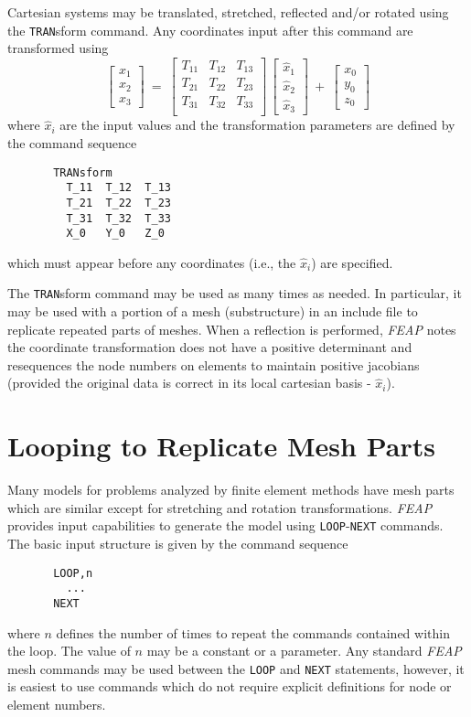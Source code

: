 Cartesian systems may be translated, stretched, reflected and/or rotated using
the {\tt TRAN}\-sform command.
Any coordinates input after this command are transformed using
$$\left[
\begin{matrix} x_1 \\ x_2 \\ x_3 \end{matrix} \right] ~=~
\left[
\begin{matrix}
T_{11} & T_{12} & T_{13} \\
T_{21} & T_{22} & T_{23} \\
T_{31} & T_{32} & T_{33} \\
\end{matrix} \right] \,
\left[
\begin{matrix} \hat x_1 \\ \hat x_2 \\ \hat x_3
\end{matrix} \right] ~+~
\left[
\begin{matrix} x_0 \\ y_0 \\ z_0
\end{matrix} \right]$$
where $\hat x_i$ are the input values and the transformation parameters are
defined by the command sequence
\begin{verbatim}
       TRANsform
         T_11  T_12  T_13
         T_21  T_22  T_23
         T_31  T_32  T_33
         X_0   Y_0   Z_0
\end{verbatim}
which must appear before any coordinates (i.e., the $\hat x_i$) are specified.

The {\tt TRAN}sform command may be used as many times as needed.  In particular,
it may be used with a portion of a mesh (substructure) in an include file
to replicate repeated parts of meshes.  When a reflection is performed,
{\sl FEAP} notes the coordinate transformation does not have a positive
determinant and resequences the node numbers on elements to maintain
positive jacobians (provided the original data is correct in its local
cartesian basis - $\hat{x}_i$).

\section{Looping to Replicate Mesh Parts}
\label{mloop}

Many models for problems analyzed by finite element methods have mesh parts
which are similar except for stretching and rotation transformations.
\textsl{FEAP} provides input capabilities to generate the model using
\texttt{LOOP}-\texttt{NEXT} commands.  The basic input structure is given
by the command sequence
\begin{verbatim}
       LOOP,n
         ...
       NEXT
\end{verbatim}
where $n$ defines the number of times to repeat the commands contained
within the loop.  The value of $n$ may be a constant or a parameter.
Any standard \textsl{FEAP} mesh commands may be used between the \texttt{LOOP}
and \texttt{NEXT} statements, however, it is easiest to use commands which do
not require explicit definitions for node or element numbers.

